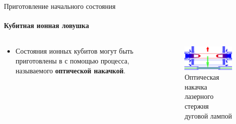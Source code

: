 \documentclass{beamer}
\begin{document}
    \begin{frame}{Приготовление начального состояния}
    \framesubtitle{Кубитная ионная ловушка}

    \begin{columns}

    \begin{column}{0.5\textwidth}

        \begin{itemize}
                \item Состояния ионных кубитов могут быть приготовлены в с помощью процесса, называемого \textbf{оптической накачкой}.
        \end{itemize}

    \end{column}

    \begin{column}{0.5\textwidth}

        \begin{figure}
            \centering
            \includegraphics[width=\textwidth]{media/optical-pumping.png}
            \caption{Оптическая накачка лазерного стержня дуговой лампой}
        \end{figure}

    \end{column}

    \end{columns}


    \end{frame}
\end{document}
